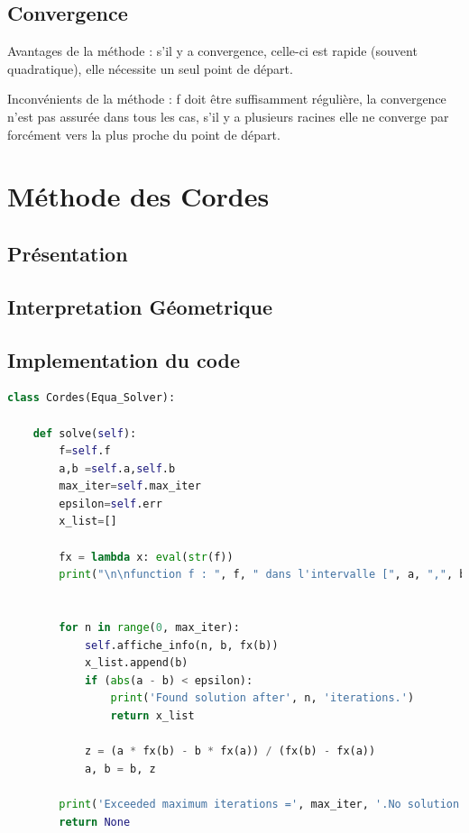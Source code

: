 \documentclass{article}
\begin{document}
\subsection{Convergence}

Avantages de la méthode : s’il y a convergence, celle-ci est rapide (souvent quadratique), elle nécessite un
seul point de départ.

Inconvénients de la méthode : f doit être suffisamment régulière, la convergence n’est pas assurée dans tous
les cas, s’il y a plusieurs racines elle ne converge par forcément vers la plus proche du point de départ.





\newpage
\section{Méthode des Cordes}
\subsection{Présentation} 
 

\subsection{Interpretation Géometrique}
\subsection{Implementation du code}
\begin{lstlisting}[language=Python, caption=Méthode des cordes en Python]
    class Cordes(Equa_Solver):
    
    def solve(self):
        f=self.f
        a,b =self.a,self.b
        max_iter=self.max_iter
        epsilon=self.err
        x_list=[]

        fx = lambda x: eval(str(f))
        print("\n\nfunction f : ", f, " dans l'intervalle [", a, ",", b, "] \n", "--------------------------------")


        for n in range(0, max_iter):
            self.affiche_info(n, b, fx(b))
            x_list.append(b)
            if (abs(a - b) < epsilon):
                print('Found solution after', n, 'iterations.')
                return x_list

            z = (a * fx(b) - b * fx(a)) / (fx(b) - fx(a))
            a, b = b, z

        print('Exceeded maximum iterations =', max_iter, '.No solution found.')
        return None
\end{lstlisting}
\newpage
\end{document}
